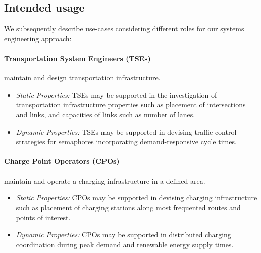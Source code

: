 \documentclass[a4paper,twoside]{article}
\begin{document}
	\subsection{Intended usage}
	\label{sec:scope}
	
We subsequently describe use-cases considering different roles
for our systems engineering approach:

\paragraph{Transportation System Engineers (TSEs)} maintain and design transportation infrastructure.
\begin{itemize}
	\item \textit{Static Properties:} %
	TSEs may be supported in the investigation of transportation infrastructure properties such as placement of intersections and links, and capacities of links such as number of lanes.
	\item \textit{Dynamic Properties:} %
	TSEs may be supported in devising traffic control strategies for semaphores incorporating demand-responsive cycle times.
\end{itemize}
	
\paragraph{Charge Point Operators (CPOs)} maintain and operate a charging infrastructure in a defined area.
\begin{itemize}
	\item \textit{Static Properties:} %
	 CPOs may be supported in devising charging infrastructure such as placement of charging stations along most frequented routes and points of interest. 
	\item \textit{Dynamic Properties:} %
	 CPOs may be supported in distributed charging coordination during peak demand and renewable energy supply times.
\end{itemize}
\end{document}
